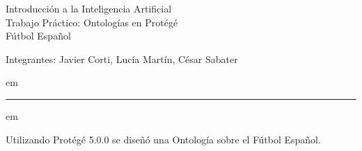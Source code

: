 \documentclass{article}
\begin{document}
\begin{center}
\Large{Introducción a la Inteligencia Artificial\\Trabajo Práctico: Ontologías en Protégé\\Fútbol Español}
\end{center}
\begin{center}
Integrantes: Javier Corti, Lucía Martín, César Sabater
\end{center}

 em
\hrule
{} em


Utilizando Protégé 5.0.0 se diseñó una Ontología sobre el Fútbol Español.

\hspace{-1.8cm}
\end{document}
